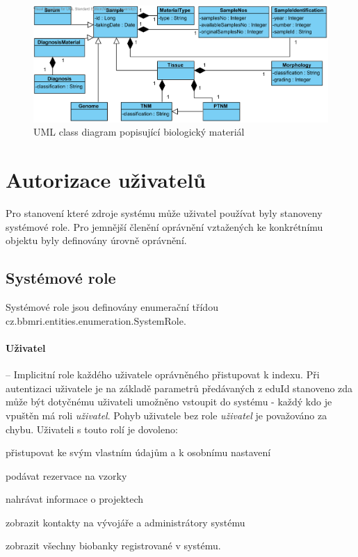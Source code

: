 \begin{figure}[h!]
\begin{center}
	\includegraphics[width=\textwidth]{SampleView}
\caption{UML class diagram popisující biologický materiál}
\label{fig:index:uml:class:sample}
\end{center}
\end{figure}


\section{Autorizace uživatelů}
Pro stanovení které zdroje systému může uživatel používat byly stanoveny systémové role. Pro jemnější členění oprávnění vztažených ke konkrétnímu objektu byly definovány úrovně oprávnění.

\subsection{Systémové role}
Systémové role jsou definovány enumerační třídou cz.bbmri.entities.enumeration.SystemRole. 

\paragraph*{Uživatel} -- Implicitní role každého uživatele oprávněného přistupovat k indexu. Při autentizaci uživatele je na základě parametrů předávaných z eduId stanoveno zda může být dotyčnému uživateli umožněno vstoupit do systému - každý kdo je vpuštěn má roli \textit{uživatel}. Pohyb uživatele bez role \textit{uživatel} je považováno za chybu.
Uživateli s touto rolí je dovoleno:
\begin{compactitem}
	\item přistupovat ke svým vlastním údajům a k osobnímu nastavení
	\item podávat rezervace na vzorky
	\item nahrávat informace o projektech
	\item zobrazit kontakty na vývojáře a administrátory systému
	\item zobrazit všechny biobanky registrované v systému.
\end{compactitem}

